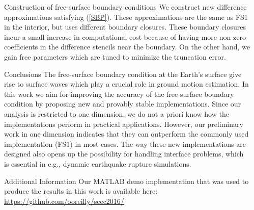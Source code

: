 \documentclass[final]{beamer}
\newlength{\sepwid}
\newlength{\onecolwid}
\begin{document}
\begin{frame}[t]
\begin{columns}[t]
\begin{column}{\sepwid}\end{column} %

\begin{column}{\onecolwid} %

\begin{block}{Construction of free-surface boundary conditions} 
  We construct new difference approximations satisfying (\ref{SBP}). These approximations are the same as FS1 in the
  interior, but uses different boundary closures. These boundary closures incur a small increase in
  computational cost because of having more non-zero coefficients in the difference stencils near the boundary. On the
  other hand, we gain free parameters which are tuned to minimize the truncation error.
\end{block}

\begin{block}{Conclusions}
  The free-surface boundary condition at the Earth's surface give rise to surface waves which play a crucial role in
  ground motion estimation.  In this work we aim for improving the accuracy of
  the free-surface boundary condition by proposing new and provably stable implementations. Since our analysis is restricted to
  one dimension, we do not a priori know how the implementations perform in practical applications. However, our preliminary work in one dimension indicates that
  they can outperform the commonly used implementation (FS1) in most cases.
  The way these new implementations are designed also opens up the possibility for handling interface problems,
  which is essential in e.g., dynamic earthquake rupture simulations.

\end{block}


\begin{block}{Additional Information}
  Our MATLAB demo implementation that was used to produce the results in this work is available here:
  \url{https://github.com/ooreilly/scec2016/}

\end{block}


\end{column}
\end{columns}
\end{frame}
\end{document}
